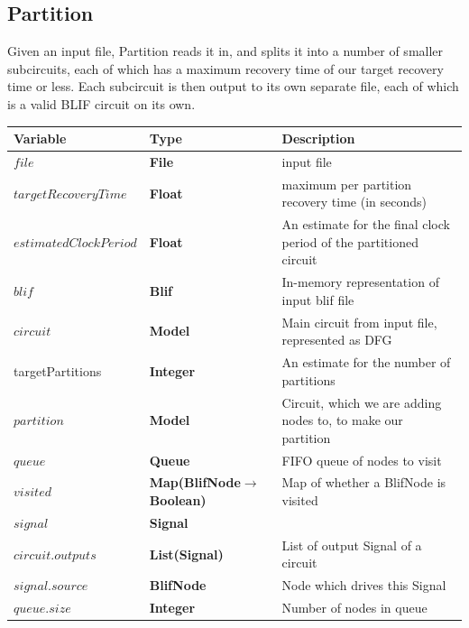 \documentclass[12pt,final,oneside]{dwThesis} %
\begin{document}
   \subsection{Partition}
   \label{algPartition} Given an input file,
   Partition reads it in, and splits it into a number of smaller subcircuits,
   each of which has a maximum recovery time of our target recovery time or
   less. Each subcircuit is then output to its own separate file, each of which
   is a valid \gls{BLIF} circuit on its own.  
   \begin{table}

      \begin{center}


         \begin{tabularx}
            {\linewidth}{llX} \toprule Variable & Type &
            Description\\
            \midrule $file$ &\textbf{File  } &  input file\\
            $targetRecoveryTime$ &\textbf{Float } &  maximum per partition
            recovery time (in seconds)\\
            $estimatedClockPeriod$ &\textbf{Float} & An estimate for the final clock period of the partitioned circuit\\
            $blif$ &\textbf{Blif } &  In-memory
            representation of input blif file\\
            $circuit$ &\textbf{Model }
            &  Main circuit from input file, represented as DFG\\
            targetPartitions & \textbf{Integer} & An estimate for the number of partitions \\
            $partition$
            &\textbf{Model } &  Circuit, which we are adding nodes to, to
            make our partition\\
            $queue$ &\textbf{Queue } &  FIFO queue of
            nodes to visit\\
            $visited$ &\textbf{Map(BlifNode$\to$ Boolean)}
            &  Map of whether a BlifNode is visited\\
            $signal$ &\textbf{Signal } &  \\
            $circuit.outputs$ &\textbf{List(Signal) } &
            List of output Signal of a circuit\\
            $signal.source$ &\textbf{BlifNode } &  Node which drives this Signal\\
            $queue.size$
            &\textbf{Integer } &  Number of nodes in queue\\

\end{tabularx}
\end{center}
\end{table}
\end{document}
